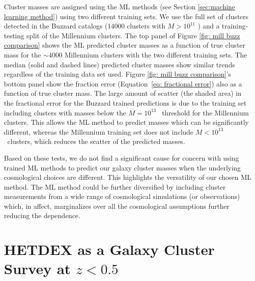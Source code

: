 \documentclass[fleqn,usenatbib]{mnras}
\begin{document}
Cluster masses are assigned using the ML methods (see Section \ref{sec:machine learning method}) using two different training sets. We use the full set of clusters detected in the Buzzard catalogs (14000 clusters with $M > 10^{11}$ \msol) and a training-testing split of the Millennium clusters. The top panel of Figure \ref{fig: mill buzz comparison} shows the ML predicted cluster masses as a function of true cluster mass for the $\sim$4000 Millennium clusters with the two different training sets. The median (solid and dashed lines) predicted cluster masses show similar trends regardless of the training data set used. Figure \ref{fig: mill buzz comparison}'s bottom panel show the fraction error (Equation~\ref{eq: fractional error}) also as a function of true cluster mass. The large amount of scatter (the shaded area) in the fractional error for the Buzzard trained predictions is due to the training set including clusters with masses below the $M = 10^{13}$ \Msol\ threshold for the Millennium clusters. This allows the ML method to predict masses which can be significantly different, whereas the Millennium training set does not include $M < 10^{13}$ \Msol\ clusters, which reduces the scatter of the predicted masses.

Based on these tests, we do not find a significant cause for concern with using trained ML methods to predict our galaxy cluster masses when the underlying cosmological choices are different. This highlights the versatility of our chosen ML method. The ML method could be further diversified by including cluster measurements from a wide range of cosmological simulations (or observations) which, in affect, marginalizes over all the cosmological assumptions further reducing the dependence.

\section{HETDEX as a Galaxy Cluster Survey at $z < 0.5$}\label{sec:discussion}
\end{document}
